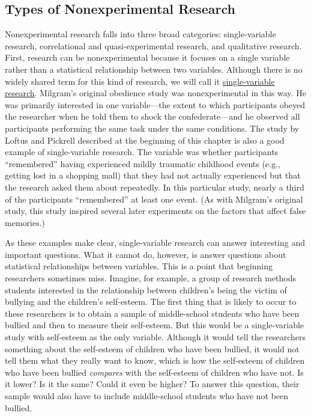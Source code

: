 \documentclass[
]{krantz}
\begin{document}
\hypertarget{types-of-nonexperimental-research}{%
\subsection*{Types of Nonexperimental Research}\label{types-of-nonexperimental-research}}


Nonexperimental research falls into three broad categories: single-variable research, correlational and quasi-experimental research, and qualitative research. First, research can be nonexperimental because it focuses on a single variable rather than a statistical relationship between two variables. Although there is no widely shared term for this kind of research, we will call it \protect\hyperlink{single-variable-research}{single-variable research}. Milgram's original obedience study was nonexperimental in this way. He was primarily interested in one variable---the extent to which participants obeyed the researcher when he told them to shock the confederate---and he observed all participants performing the same task under the same conditions. The study by Loftus and Pickrell described at the beginning of this chapter is also a good example of single-variable research. The variable was whether participants ``remembered'' having experienced mildly traumatic childhood events (e.g., getting lost in a shopping mall) that they had not actually experienced but that the research asked them about repeatedly. In this particular study, nearly a third of the participants ``remembered'' at least one event. (As with Milgram's original study, this study inspired several later experiments on the factors that affect false memories.)

As these examples make clear, single-variable research can answer interesting and important questions. What it cannot do, however, is answer questions about statistical relationships between variables. This is a point that beginning researchers sometimes miss. Imagine, for example, a group of research methods students interested in the relationship between children's being the victim of bullying and the children's self-esteem. The first thing that is likely to occur to these researchers is to obtain a sample of middle-school students who have been bullied and then to measure their self-esteem. But this would be a single-variable study with self-esteem as the only variable. Although it would tell the researchers something about the self-esteem of children who have been bullied, it would not tell them what they really want to know, which is how the self-esteem of children who have been bullied \emph{compares} with the self-esteem of children who have not. Is it lower? Is it the same? Could it even be higher? To answer this question, their sample would also have to include middle-school students who have not been bullied.
\end{document}
